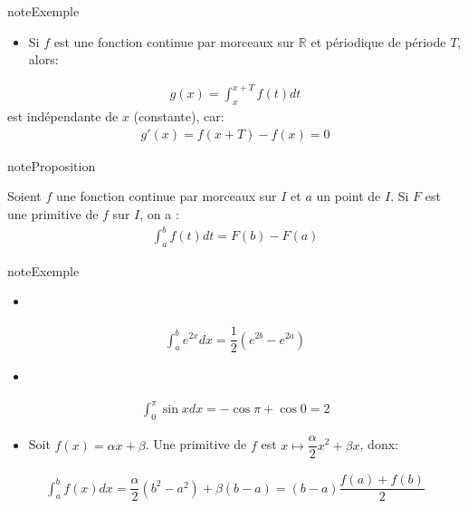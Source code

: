 \documentclass[letterpaper,10pt,french]{jupyterBook}
\begin{document}
\begin{sphinxadmonition}{note}{Exemple}
\begin{itemize}
\item {} 
\sphinxAtStartPar
Si \(f\) est une fonction continue par morceaux sur \(\mathbb{R}\) et périodique de période \(T\), alors:

\end{itemize}
\begin{equation*}
\begin{split}
g(x) = \int_x^{x+T}f(t)dt
\end{split}
\end{equation*}
\sphinxAtStartPar
est indépendante de \(x\) (constante), car:
\begin{equation*}
\begin{split}
g'(x) = f(x+T) - f(x) = 0
\end{split}
\end{equation*}\end{sphinxadmonition}

\begin{sphinxadmonition}{note}{Proposition}

\sphinxAtStartPar
Soient \(f\) une fonction continue par morceaux sur \(I\) et \(a\) un point de \(I\). Si \(F\) est une primitive de \(f\) sur \(I\), on a :
\begin{equation*}
\begin{split}
\int_a^b f(t) dt = F(b) - F(a)
\end{split}
\end{equation*}\end{sphinxadmonition}

\begin{sphinxadmonition}{note}{Exemple}
\begin{itemize}
\item {} 
\end{itemize}
\begin{equation*}
\begin{split}
\int_a^b e^{2x} dx = \dfrac{1}{2} (e^{2b} - e^{2a})
\end{split}
\end{equation*}\begin{itemize}
\item {} 
\end{itemize}
\begin{equation*}
\begin{split}
\int_0^\pi \sin x dx = - \cos \pi + \cos 0 = 2
\end{split}
\end{equation*}\begin{itemize}
\item {} 
\sphinxAtStartPar
Soit \(f(x)=\alpha x + \beta\). Une primitive de \(f\) est \(x \mapsto \dfrac{\alpha}{2}x^2 + \beta x\), donx:

\end{itemize}
\begin{equation*}
\begin{split}
\int_a^bf(x)dx = \dfrac{\alpha}{2}(b^2 - a^2) + \beta (b-a) = (b-a)\dfrac{f(a)+ f(b)}{2}
\end{split}
\end{equation*}\end{sphinxadmonition}
\end{document}

